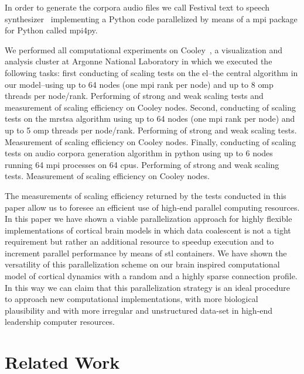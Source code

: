 \documentclass[10pt,journal,compsoc]{IEEEtran}
\begin{document}
In order to generate the corpora audio files we call Festival text to speech synthesizer~\cite{festival2014} implementing a Python code parallelized by means of a \gls{mpi} package for Python called mpi4py.

We performed all computational experiments on Cooley~\cite{noauthor_cooley_nodate}, a visualization and analysis cluster at Argonne National Laboratory in which we executed the following tasks: first conducting of scaling tests on the \gls{el}--the central algorithm in our model--using up to 64 nodes (one \gls{mpi} rank per node) and up to 8 \gls{omp} threads per node/rank. Performing of strong and weak scaling tests and measurement of scaling efficiency on Cooley nodes. Second, conducting of scaling tests on the \gls{mrstsa} algorithm using up to 64 nodes (one \gls{mpi} rank per node) and up to 5 \gls{omp} threads per node/rank. Performing of strong and weak scaling tests. Measurement of scaling efficiency on Cooley nodes. Finally, conducting of scaling tests on audio corpora generation algorithm in python using up to 6 nodes running 64 \gls{mpi} processes on 64 \glspl{cpu}. Performing of strong and weak scaling tests. Measurement of scaling efficiency on Cooley nodes.

The measurements of scaling efficiency returned by the tests conducted in this paper allow us to foresee an efficient use of high-end parallel computing resources. In this paper we have shown a viable parallelization approach for highly flexible implementations of cortical brain models in which data coalescent is not a tight requirement but rather an additional resource to speedup execution and to increment parallel performance by means of \gls{stl} containers. We have shown the versatility of this parallelization scheme on our brain inspired computational model of cortical dynamics with a random and a highly sparse connection profile. In this way we can claim that this parallelization strategy is an ideal procedure to approach new computational implementations, with more biological plausibility and with more irregular and unstructured data-set in high-end leadership computer resources.


















\section{Related Work}
\end{document}

